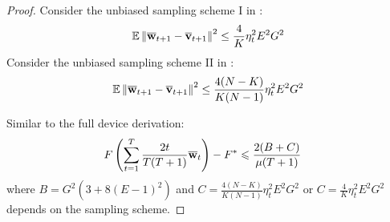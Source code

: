 \begin{proof}
Consider the unbiased sampling scheme I in \cite{li2019convergence}:
\begin{align}
\mathbb{E}\left\|{\overline{\mathbf{w}}}_{t+1} - {\overline{\mathbf{v}}}_{t+1}\right\|^2	\leq \frac{4}{K} \eta_t^2 E^2G^2
\end{align}
Consider the unbiased sampling scheme II in \cite{li2019convergence}:
\begin{align}
\mathbb{E}\left\|{\overline{\mathbf{w}}}_{t+1} - {\overline{\mathbf{v}}}_{t+1}\right\|^2	\leq \frac{4(N - K)}{K(N-1)} \eta_t^2 E^2G^2
\end{align}

Similar to the full device derivation:
\begin{align}
F\left(\sum_{t=1}^T \frac{2t}{T(T+1)} {\overline{\mathbf{w}}}_{t}\right)-F^{*} & \leqslant \frac{2(B + C)}{\mu(T+1)} 	
\end{align}
where $B =  G^2 (3  + 8 (E-1)^2)$ and $C =\frac{4(N - K)}{K(N-1)} \eta_t^2 E^2G^2 $ or
$C = \frac{4}{K} \eta_t^2 E^2G^2$ depends on the sampling scheme.



\end{proof}